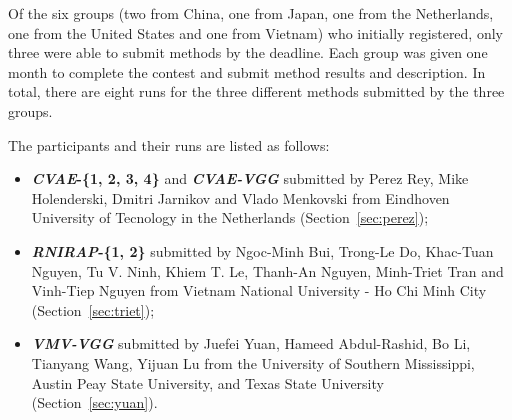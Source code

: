 \documentclass[../main.tex]{subfiles}
\begin{document}
Of the six groups (two from China, one from Japan, one from the Netherlands, one from the United States and one from Vietnam) who initially registered, only three were able to submit methods by the deadline. Each group was given one month to complete the contest and  submit method results and description. In total, there are eight runs for the three different methods submitted by the three groups. 

The participants and their runs are listed as follows:

\begin{itemize}
	
	\item  \textbf{\textit{CVAE}-\{1, 2, 3, 4\} } and \textbf{\textit{CVAE-VGG}} submitted by Perez Rey, Mike Holenderski, Dmitri Jarnikov and Vlado Menkovski from Eindhoven University of Tecnology in the Netherlands (Section~\ref{sec:perez});
	
	\item  \textbf{\textit{RNIRAP}-\{1, 2\}} submitted by 
	Ngoc-Minh Bui, Trong-Le Do, Khac-Tuan Nguyen, Tu V. Ninh, 
	Khiem T. Le, Thanh-An Nguyen, Minh-Triet Tran and Vinh-Tiep 
	Nguyen from Vietnam National University - Ho Chi Minh City 
	(Section~\ref{sec:triet});

	\item  \textbf{\textit{VMV-VGG}} submitted by Juefei Yuan, Hameed Abdul-Rashid, Bo Li, Tianyang Wang, Yijuan Lu from the University of Southern Mississippi, Austin Peay State University, and Texas State University (Section~\ref{sec:yuan}).
	
\end{itemize}
\end{document}

